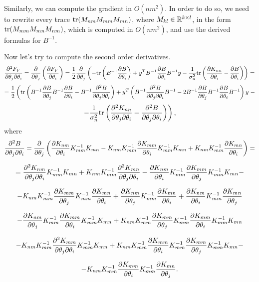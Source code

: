 \documentclass[12pt]{article}
\begin{document}
		Similarly, we can compute the gradient in $O(nm^2)$. In order to do so, we need to rewrite every trace $\mbox{tr}(M_{nm} M_{mm} M_{mn})$, where $M_{kl} \in \mathbb{R}^{k \times l}$, in the form $\mbox{tr}(M_{mm} M_{mn} M_{nm})$, which is computed in $O(nm^2)$, and use the derived formulas for $B^{-1}$.

		Now let's try to compute the second order derivatives.
		$$\frac{\partial^2 F_V} {\partial \theta_j \partial\theta_i} = \frac{\partial }{\partial \theta_j} \left(\frac{\partial F_V}{\partial \theta_i}\right) = \frac 1 2 \frac{\partial }{\partial \theta_j} \left( -\mbox{tr} \left(B^{-1} \frac{\partial B}{\partial \theta_i}\right) + y^T B^{-1} \frac{\partial B}{\partial \theta_i} B^{-1} y - \frac 1 {\sigma_n^2} \mbox{tr} \left(\frac{\partial K_{nn}}{\partial \theta_i} - \frac{\partial B}{\partial \theta_i}\right)\right) = $$
		$$ = \frac 1 2 \left(\mbox{tr}\left( B^{-1} \frac{\partial B}{\partial \theta_j} B^{-1}\frac{\partial B}{\partial \theta_i} - B^{-1} \frac{\partial^2 B}{\partial \theta_j \partial \theta_i}\right) + y^T \left(B^{-1} \frac{\partial^2 B}{\partial \theta_j \partial \theta_i} B^{-1}  - 2 B^{-1} \frac{\partial B}{\partial \theta_j} B^{-1} \frac{\partial B}{\partial \theta_i} B^{-1} \right) y \right. - $$
		$$ \left.- \frac 1 {\sigma_n^2} \mbox{tr}\left(\frac{\partial^2 K_{nn}}{\partial \theta_j \partial \theta_i} - \frac{\partial^2 B}{\partial \theta_j \partial \theta_i}\right)\right),$$
		where
		$$\frac{\partial^2 B}{\partial \theta_j \partial \theta_i} = \frac{\partial }{\partial \theta_j} \left(\frac{\partial K_{nm}}{\partial \theta_i}K_{mm}^{-1} K_{mn} - K_{nm} K_{mm}^{-1} \frac{\partial K_{mm}}{\partial \theta_i}K_{mm}^{-1} K_{mn} +  K_{nm} K_{mm}^{-1} \frac{\partial K_{mn}}{\partial \theta_i}\right) = $$

		$$ = \frac{\partial^2 K_{nm}}{\partial \theta_j \partial \theta_i}K_{mm}^{-1} K_{mn} + K_{nm} K_{mm}^{-1}\frac{\partial^2 K_{mn}}{\partial \theta_j \partial \theta_i}  - \frac{\partial K_{nm}}{\partial \theta_i}K_{mm}^{-1} \frac{\partial K_{mm}}{\partial \theta_j}K_{mm}^{-1}K_{mn} - $$
		
		$$- K_{nm} K_{mm}^{-1} \frac{\partial K_{mm}}{\partial \theta_j}K_{mm}^{-1}\frac{\partial K_{mn}}{\partial \theta_i} + \frac{\partial K_{nm}}{\partial \theta_j}K_{mm}^{-1} \frac{\partial K_{mn}}{\partial \theta_i} + \frac{\partial K_{nm}}{\partial \theta_i} K_{mm}^{-1} \frac{\partial K_{mn}}{\partial \theta_j} $$

		$$- \frac{\partial K_{nm}}{\partial \theta_j} K_{mm}^{-1} \frac{\partial K_{mm}}{\partial \theta_i}K_{mm}^{-1} K_{mn} + K_{nm} K_{mm}^{-1}\frac{\partial K_{mm}}{\partial \theta_j} K_{mm}^{-1}\frac{\partial K_{mm}}{\partial \theta_i}K_{mm}^{-1} K_{mn}$$

		$$ - K_{nm} K_{mm}^{-1} \frac{\partial^2 K_{mm}}{\partial \theta_j \partial \theta_i}K_{mm}^{-1} K_{mn} + K_{nm} K_{mm}^{-1} \frac{\partial K_{mm}}{\partial \theta_i}K_{mm}^{-1}\frac{\partial K_{mm}}{\partial \theta_j}K_{mm}^{-1} K_{mn} - $$

		$$- K_{nm} K_{mm}^{-1} \frac{\partial K_{mm}}{\partial \theta_i}K_{mm}^{-1} \frac{\partial K_{mn}}{\partial \theta_j}.$$
\end{document}
